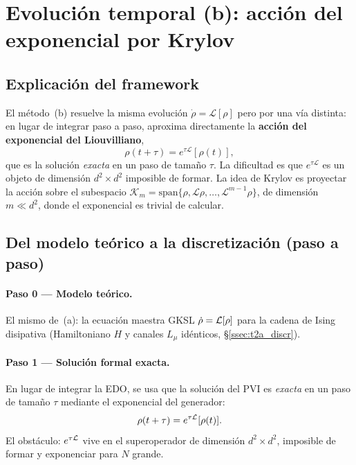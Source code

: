 \section{Evolución temporal (b): acción del exponencial por Krylov}
\label{sec:t2b}

\subsection{Explicación del framework}
El método~(b) resuelve la misma evolución $\dot\rho=\mathcal{L}[\rho]$ pero por una
vía distinta: en lugar de integrar paso a paso, aproxima directamente la
\textbf{acción del exponencial del Liouvilliano},
\[
\rho(t+\tau)=e^{\tau\mathcal{L}}[\rho(t)],
\]
que es la solución \emph{exacta} en un paso de tamaño $\tau$. La dificultad es que
$e^{\tau\mathcal{L}}$ es un objeto de dimensión $d^2\times d^2$ imposible de
formar. La idea de Krylov es proyectar la acción sobre el subespacio
$\mathcal{K}_m=\text{span}\{\rho,\mathcal{L}\rho,\dots,\mathcal{L}^{m-1}\rho\}$,
de dimensión $m\ll d^2$, donde el exponencial es trivial de calcular.

\subsection{Del modelo teórico a la discretización (paso a paso)}
\label{ssec:t2b_discr}

\paragraph{Paso 0 — Modelo teórico.} El mismo de~(a): la ecuación maestra GKSL
$\dot\rho=\mathcal{L}[\rho]$ para la cadena de Ising disipativa (Hamiltoniano $H$ y
canales $L_\mu$ idénticos, \S\ref{ssec:t2a_discr}).

\paragraph{Paso 1 — Solución formal exacta.} En lugar de integrar la EDO, se usa
que la solución del PVI es \emph{exacta} en un paso de tamaño $\tau$ mediante el
exponencial del generador:
\[
\rho(t+\tau)=e^{\tau\mathcal{L}}[\rho(t)].
\]
El obstáculo: $e^{\tau\mathcal{L}}$ vive en el superoperador de dimensión
$d^2\times d^2$, imposible de formar y exponenciar para $N$ grande.

